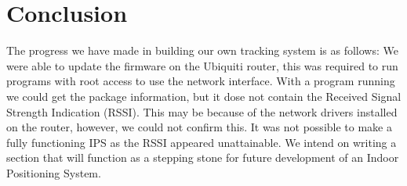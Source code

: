 \section*{Conclusion}
The progress we have made in building our own tracking system is as follows: We were able to update the firmware on the Ubiquiti router, this was required to run programs with root access to use the network interface. With a program running we could get the package information, but it dose not contain the Received Signal Strength Indication (RSSI). This may be because of the network drivers installed on the router, however, we could not confirm this. It was not possible to make a fully functioning IPS as the RSSI appeared unattainable. We intend on writing a section that will function as a stepping stone for future development of an Indoor Positioning System. 
